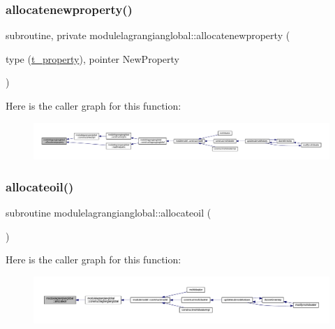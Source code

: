 \subsubsection{\texorpdfstring{allocatenewproperty()}{allocatenewproperty()}}
{\footnotesize\ttfamily subroutine, private modulelagrangianglobal\+::allocatenewproperty (\begin{DoxyParamCaption}\item[{type (\mbox{\hyperlink{structmodulelagrangianglobal_1_1t__property}{t\+\_\+property}}), pointer}]{New\+Property }\end{DoxyParamCaption})\hspace{0.3cm}{\ttfamily [private]}}

Here is the caller graph for this function\+:\nopagebreak
\begin{figure}[H]
\begin{center}
\leavevmode
\includegraphics[width=350pt]{namespacemodulelagrangianglobal_aa537bff97afb419645e62f2b096b2e56_icgraph}
\end{center}
\end{figure}
\mbox{\label{namespacemodulelagrangianglobal_a0be041be04e7755f84bc26f6dfe301b0}} 
\subsubsection{\texorpdfstring{allocateoil()}{allocateoil()}}
{\footnotesize\ttfamily subroutine modulelagrangianglobal\+::allocateoil (\begin{DoxyParamCaption}{ }\end{DoxyParamCaption})\hspace{0.3cm}{\ttfamily [private]}}

Here is the caller graph for this function\+:\nopagebreak
\begin{figure}[H]
\begin{center}
\leavevmode
\includegraphics[width=350pt]{namespacemodulelagrangianglobal_a0be041be04e7755f84bc26f6dfe301b0_icgraph}
\end{center}
\end{figure}
\mbox{\label{namespacemodulelagrangianglobal_a8a4e3b4aa0ee023ec48a0d9e44b5df43}} 
